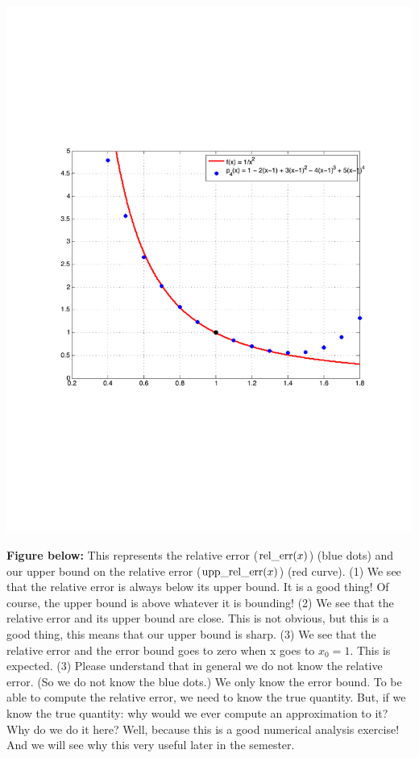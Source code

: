 \documentclass[pdftex,11pt]{article}
\begin{document}
\includegraphics[width=.7\textwidth]{sauer-exercise-0-5-6/EX_0_5_6_fig1}

\textbf{Figure below:} This represents the relative error
($\textmd{rel\_err}(x)$) (blue dots) and our upper bound on the relative error
($\textmd{upp\_rel\_err}(x)$) (red curve). (1) We see that the relative error
is always below its upper bound. It is a good thing! Of course, the upper bound
is above whatever it is bounding! (2) We see that the relative error and its
upper bound are close. This is not obvious, but this is a good thing, this
means that our upper bound is sharp.  (3) We see that the relative error and
the error bound goes to zero when x goes to $x_0=1$. This is expected.  (3)
Please understand that in general we do not know the relative error.  (So we do
not know the blue dots.) We only know the error bound. To be able to compute
the relative error, we need to know the true quantity. But, if we know the true
quantity: why would we ever compute an approximation to it?  Why do we do it
here? Well, because this is a good numerical analysis exercise! And we will see
why this very useful later in the semester.
\end{document}
